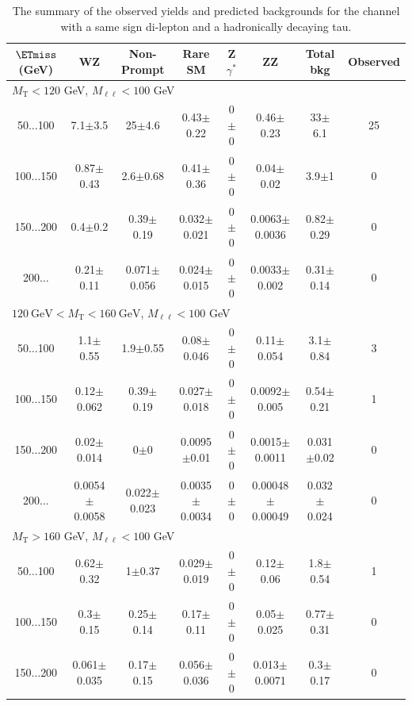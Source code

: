 \begin{landscape}
\begin{table}
\begin{center}
\caption{\label{tab:SStau1} The summary of the observed yields and predicted backgrounds for the channel 
with a same sign di-lepton and a hadronically decaying tau. }
\begin{tabular}{| c | c c c c c c c | }\hline\hline
$\ETmiss$ (GeV) & WZ & Non-Prompt & Rare SM & Z$\gamma^*$ & ZZ & Total bkg & Observed\\\hline\hline
\multicolumn{8}{l}{$M_{\text{T}} < 120$ GeV, $M_{\ell\ell} < 100$ GeV}\\\hline\hline
50$\dots$100&7.1$\pm$3.5&25$\pm$4.6&0.43$\pm$0.22&0$\pm$0&0.46$\pm$0.23&33$\pm$6.1&25\\
100$\dots$150&0.87$\pm$0.43&2.6$\pm$0.68&0.41$\pm$0.36&0$\pm$0&0.04$\pm$0.02&3.9$\pm$1&0\\
150$\dots$200&0.4$\pm$0.2&0.39$\pm$0.19&0.032$\pm$0.021&0$\pm$0&0.0063$\pm$0.0036&0.82$\pm$0.29&0\\
200$\dots$&0.21$\pm$0.11&0.071$\pm$0.056&0.024$\pm$0.015&0$\pm$0&0.0033$\pm$0.002&0.31$\pm$0.14&0\\
\hline\hline
\multicolumn{8}{l}{$120~\mathrm{GeV} < M_{\text{T}} < 160~\mathrm{GeV}$, $M_{\ell\ell} < 100$ GeV}\\\hline\hline
50$\dots$100&1.1$\pm$0.55&1.9$\pm$0.55&0.08$\pm$0.046&0$\pm$0&0.11$\pm$0.054&3.1$\pm$0.84&3\\
100$\dots$150&0.12$\pm$0.062&0.39$\pm$0.19&0.027$\pm$0.018&0$\pm$0&0.0092$\pm$0.005&0.54$\pm$0.21&1\\
150$\dots$200&0.02$\pm$0.014&0$\pm$0&0.0095$\pm$0.01&0$\pm$0&0.0015$\pm$0.0011&0.031$\pm$0.02&0\\
200$\dots$&0.0054$\pm$0.0058&0.022$\pm$0.023&0.0035$\pm$0.0034&0$\pm$0&0.00048$\pm$0.00049&0.032$\pm$0.024&0\\
\hline\hline
\multicolumn{8}{l}{$M_{\text{T}} > 160$ GeV, $M_{\ell\ell} < 100$ GeV}\\\hline\hline
50$\dots$100&0.62$\pm$0.32&1$\pm$0.37&0.029$\pm$0.019&0$\pm$0&0.12$\pm$0.06&1.8$\pm$0.54&1\\
100$\dots$150&0.3$\pm$0.15&0.25$\pm$0.14&0.17$\pm$0.11&0$\pm$0&0.05$\pm$0.025&0.77$\pm$0.31&0\\
150$\dots$200&0.061$\pm$0.035&0.17$\pm$0.15&0.056$\pm$0.036&0$\pm$0&0.013$\pm$0.0071&0.3$\pm$0.17&0\\

\end{tabular}
\end{center}
\end{table}
\end{landscape}
